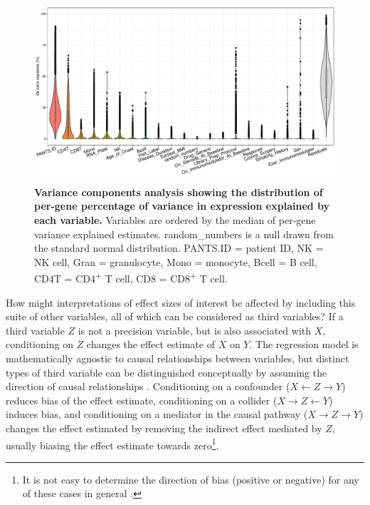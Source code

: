 \begin{figure}
    \centering
    \includegraphics[width=1.0\textwidth,page=1]{mainmatter/figures/chapter_04/dream.plotVarPart.pdf}
    \caption{
        \textbf{Variance components analysis showing the distribution of per-gene percentage of variance in expression explained by each variable.}
        Variables are ordered by the median of per-gene variance explained estimates.
        random\_numbers is a null drawn from the standard normal distribution.
        PANTS.ID = patient ID, NK = \gls{NK} cell, Gran = granulocyte, Mono = monocyte, Bcell = B cell, CD4T = CD4\textsuperscript{+} T cell, CD8 = CD8\textsuperscript{+} T cell.
}
    \label{fig:multipants_varPart}
\end{figure}

How might interpretations of effect sizes of interest be affected by including this suite of other variables, all of which can be considered as third variables?
If a third variable $Z$ is not a precision variable, but is also associated with $X$, conditioning on $Z$ changes the effect estimate of $X$ on $Y$.
The regression model is mathematically agnostic to causal relationships between variables,
but distinct types of third variable can be distinguished conceptually by assuming the direction of causal relationships \autocite{mackinnon2000EquivalenceMediationConfounding}.
Conditioning on a confounder ($X \leftarrow Z \rightarrow Y$) reduces bias of the effect estimate,
conditioning on a collider ($X \rightarrow Z \leftarrow Y$) induces bias,
and conditioning on a mediator in the causal pathway ($X \rightarrow Z \rightarrow Y$) changes the effect estimated by removing the indirect effect mediated by $Z$,
usually biasing the effect estimate towards zero\footnote{It is not easy to determine the direction of bias (positive or negative) for any of these cases in general \autocite{suzuki2020CausalDiagramsPitfalls}.}.

